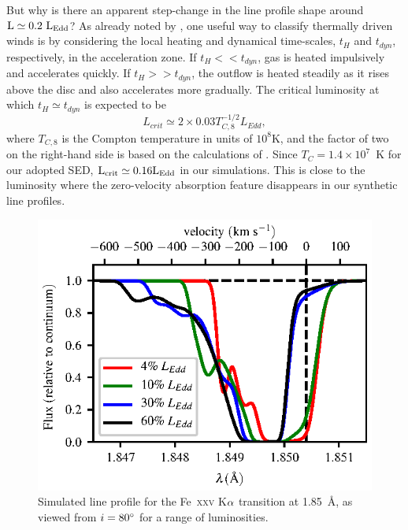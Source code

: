 \documentclass[a4paper,fleqn,usenatbib]{mnras}
\begin{document}
But why is there an apparent step-change in the line profile shape
around $\rm{L \simeq 0.2~L_{Edd}}$? As already noted by
\cite{1983ApJ...271...70B}, one useful way to classify thermally
driven winds is by considering the local heating and dynamical 
time-scales, $t_H$ and $t_{dyn}$, respectively, in the acceleration
zone. If $t_H << t_{dyn}$, gas is heated impulsively and accelerates
quickly. If $t_H >> t_{dyn}$, the outflow is heated steadily as it
rises above the disc and also accelerates more gradually. The critical
luminosity at which $t_H \simeq t_{dyn}$ is expected to be 
\begin{equation}
L_{crit} \simeq 2\times 0.03 T_{C,8}^{-1/2}L_{Edd},
\end{equation}
where $T_{C,8}$ is the Compton temperature in units of $10^8$K,
and the factor of two on the right-hand side is based on the
calculations of  \cite[hereafter W96]{1996ApJ...461..767W}. Since $T_C=1.4\times10^7$~K
for our adopted SED, $\rm{L_{crit} \simeq 0.16 L_{Edd}}$ in our
simulations. This is close to the luminosity where the zero-velocity
absorption feature disappears in our synthetic line profiles.

\begin{figure}
\includegraphics[width=\columnwidth]{figures/fig5_80_degrees_fe25.eps}
\caption{Simulated line profile for the Fe~\textsc{xxv} K$\rm{\alpha}$
transition at 1.85~{\AA}, as viewed from $i = 80\degree$ for a range
of luminosities.}
\label{figure:line25}
\end{figure}
\end{document}
